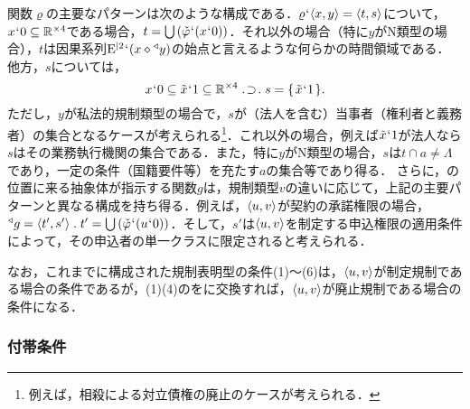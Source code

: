 関数$ \varrho $の主要なパターンは次のような構成である．$\varrho{\mspace{1mu}{`}\mspace{1mu}}\langle x,y \rangle = \langle t,s \rangle$について，$ x{\mspace{1mu}{`}\mspace{1mu}} 0\subseteq\mathbb{R}^{\times 4} $である場合，$ t = {\textstyle\bigcup}\mspace{3mu}(\check{\varphi}{\mspace{1mu}{`}\mspace{1mu}} (x{\mspace{1mu}{`}\mspace{1mu}} 0)) $．それ以外の場合（特に$ y $がN類型の場合），$t$は因果系列$ \mathrm{E}^{\mid 2}{\mspace{1mu}{`}\mspace{1mu}}(x\diamond{^\triangleleft}y) $の始点と言えるような何らかの時間領域である．
他方，$s$については，
\[
    x\fap 0\subseteq \tilde{x}\fap 1\subseteq\timex{\mathbb{R}}{4}\case{1}{1}{1}s = \classab{\tilde{x}\fap 1}.
\]
ただし，$ y $が私法的規制類型の場合で，$s$が（法人を含む）当事者（権利者と義務者）の集合となるケースが考えられる\footnote{例えば，相殺による対立債権の廃止のケースが考えられる．}．これ以外の場合，例えば$ \tilde{x}{\mspace{1mu}{`}\mspace{1mu}} 1 $が法人なら$s$はその業務執行機関の集合である．また，特に$y$がN類型の場合，$ s $は$ t\cap a\neq \Lambda $であり，一定の条件（国籍要件等）を充たす$a$の集合等であり得る．
さらに，\kagi{$ \varrho $}の位置に来る抽象体が指示する関数$g$は，規制類型$ v $の違いに応じて，上記の主要パターンと異なる構成を持ち得る．例えば，$ \langle u,v \rangle $が契約の承諾権限の場合，$ \trgl{g} = \orp{t',s'}\con{1}t' = \union{(\check{\varphi}\fap(u\fap 0))} $．そして，$s'$は$\langle u,v \rangle$を制定する申込権限の適用条件によって，その申込者の単一クラスに限定されると考えられる．

なお，これまでに構成された規制表明型の条件(1)〜(6)は，$ \langle u,v \rangle $が制定規制である場合の条件であるが，(1)(4)のをに交換すれば，$\langle u,v \rangle$が廃止規制である場合の条件になる．

\subsubsection{付帯条件}
\label{sssec:付帯条件}

